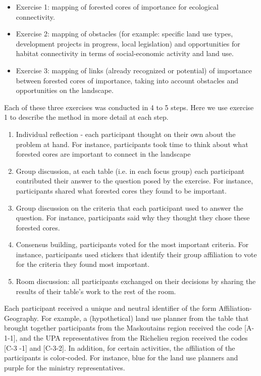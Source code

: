 \begin{itemize}
  \item Exercise 1: mapping of forested cores of importance for ecological connectivity.
  \item Exercise 2: mapping of obstacles (for example: specific land use types, development projects in progress, local legislation) and opportunities for habitat connectivity in terms of social-economic activity and land use.
  \item Exercise 3: mapping of links (already recognized or potential) of importance between forested cores of importance, taking into account obstacles and opportunities on the landscape.
\end{itemize}

Each of these three exercises was conducted in 4 to 5 steps. Here we use exercise 1 to describe the method in more detail at each step.

\begin{enumerate}
\item Individual reflection - each participant thought on their own about the problem at hand. For instance, participants took time to think about what forested cores are important to connect in the landscape
\item Group discussion, at each table (i.e. in each focus group) each participant contributed their answer to the question posed by the exercise. For instance, participants shared what forested cores they found to be important.
\item Group discussion on the criteria that each participant used to answer the question. For instance, participants said why they thought they chose these forested cores.
\item Consensus building, participants voted for the most important criteria. For instance, participants used stickers that identify their group affiliation to vote for the criteria they found most important.
\item Room discussion: all participants exchanged on their decisions by sharing the results of their table’s work to the rest of the room.
\end{enumerate}

Each participant received a unique and neutral identifier of the form Affiliation-Geography. For example, a (hypothetical) land use planner from the table that brought together participants from the Maskoutains region received the code [A-1-1], and the UPA representatives from the Richelieu region received the codes [C-3 -1] and [C-3-2]. In addition, for certain activities, the affiliation of the participants is color-coded. For instance, blue for the land use planners and purple for the ministry representatives.

